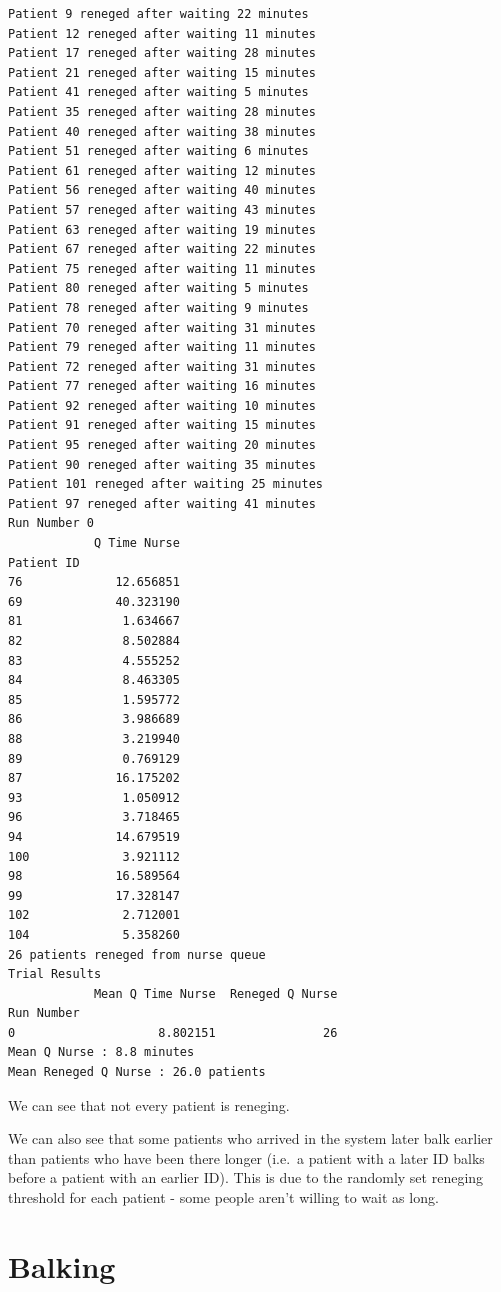 \documentclass[
  letterpaper,
  DIV=11,
  numbers=noendperiod]{scrreprt}
\begin{document}
\begin{verbatim}
Patient 9 reneged after waiting 22 minutes
Patient 12 reneged after waiting 11 minutes
Patient 17 reneged after waiting 28 minutes
Patient 21 reneged after waiting 15 minutes
Patient 41 reneged after waiting 5 minutes
Patient 35 reneged after waiting 28 minutes
Patient 40 reneged after waiting 38 minutes
Patient 51 reneged after waiting 6 minutes
Patient 61 reneged after waiting 12 minutes
Patient 56 reneged after waiting 40 minutes
Patient 57 reneged after waiting 43 minutes
Patient 63 reneged after waiting 19 minutes
Patient 67 reneged after waiting 22 minutes
Patient 75 reneged after waiting 11 minutes
Patient 80 reneged after waiting 5 minutes
Patient 78 reneged after waiting 9 minutes
Patient 70 reneged after waiting 31 minutes
Patient 79 reneged after waiting 11 minutes
Patient 72 reneged after waiting 31 minutes
Patient 77 reneged after waiting 16 minutes
Patient 92 reneged after waiting 10 minutes
Patient 91 reneged after waiting 15 minutes
Patient 95 reneged after waiting 20 minutes
Patient 90 reneged after waiting 35 minutes
Patient 101 reneged after waiting 25 minutes
Patient 97 reneged after waiting 41 minutes
Run Number 0
            Q Time Nurse
Patient ID              
76             12.656851
69             40.323190
81              1.634667
82              8.502884
83              4.555252
84              8.463305
85              1.595772
86              3.986689
88              3.219940
89              0.769129
87             16.175202
93              1.050912
96              3.718465
94             14.679519
100             3.921112
98             16.589564
99             17.328147
102             2.712001
104             5.358260
26 patients reneged from nurse queue
Trial Results
            Mean Q Time Nurse  Reneged Q Nurse
Run Number                                    
0                    8.802151               26
Mean Q Nurse : 8.8 minutes
Mean Reneged Q Nurse : 26.0 patients
\end{verbatim}

We can see that not every patient is reneging.

We can also see that some patients who arrived in the system later balk
earlier than patients who have been there longer (i.e.~a patient with a
later ID balks before a patient with an earlier ID). This is due to the
randomly set reneging threshold for each patient - some people aren't
willing to wait as long.

\section{Balking}\label{balking}
\end{document}
